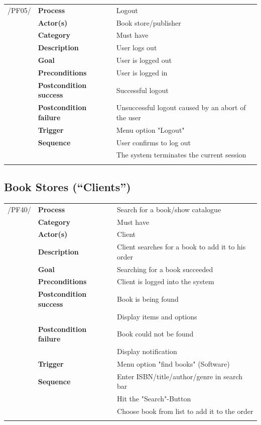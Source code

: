 \documentclass[11pt,a4paper,oneside,svgnames]{report}
\begin{document}
\noindent
\begin{tabular}{p{1.5cm}p{3cm}p{8cm}}
/PF05/	& \textbf{Process} & Logout\\
		& \textbf{Actor(s)} & Book store/publisher\\
		& \textbf{Category} & Must have\\
		& \textbf{Description}	 & User logs out\\
		& \textbf{Goal} & User is logged out\\
		& \textbf{Preconditions} & User is logged in\\
		& \textbf{Postcondition success} & Successful logout\\
		& \textbf{Postcondition failure} & Unsuccessful logout caused by an abort of the user\\
		& \textbf{Trigger} & Menu option "Logout"\\
		& \textbf{Sequence} & User confirms to log out\\
		& & The system terminates the current session\\
\hfill \\
\end{tabular}


\subsection{Book Stores (``Clients'')}

\noindent
\begin{tabular}{p{1.5cm}p{3cm}p{8cm}}
	 /PF40/	& \textbf{Process} & Search for a book/show catalogue\\ 
		& \textbf{Category} & Must have\\
		& \textbf{Actor(s)} & Client\\ 
		& \textbf{Description}	 & Client searches for a book to add it to his order\\ 
		& \textbf{Goal} & Searching for a book succeeded\\
		& \textbf{Preconditions} & Client is logged into the system\\
		& \textbf{Postcondition success} & Book is being found\\
		& & Display items and options\\
		& \textbf{Postcondition failure} & Book could not be found\\
		& & Display notification\\
		& \textbf{Trigger} & Menu option "find books" (Software)\\
		& \textbf{Sequence} & Enter ISBN/title/author/genre in search bar\\
		& & Hit the "Search"-Button\\
		& & Choose book from list to add it to the order\\
\hfill \\
\end{tabular}
\end{document}
